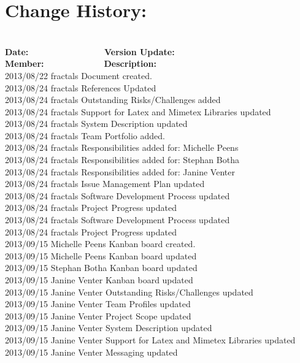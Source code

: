 \documentclass[29pt,a4paper]{moderncv}
\begin{document}
\section{\textbf{Change History:}}
\begin{tabbing}
\\\textbf{Date:} ~~~~~~~~~~~~~~~~~\= \textbf{Version Update:}~~~~~~~ \= \textbf{Member:}~~~~~~~~~~~~~~\= \textbf{Description:}\\
2013/08/22 \> fractals \> Document created.\\
2013/08/24  \> fractals \> References Updated\\
2013/08/24  \> fractals \> Outstanding Risks/Challenges added\\
2013/08/24  \> fractals \> Support for Latex and Mimetex Libraries updated\\
2013/08/24  \> fractals \> System Description updated\\
2013/08/24  \> fractals \> Team Portfolio added. \\
2013/08/24  \> fractals \> Responsibilities added for: Michelle Peens\\
2013/08/24  \> fractals \> Responsibilities added for: Stephan Botha\\	
2013/08/24  \> fractals \> Responsibilities added for: Janine Venter\\
2013/08/24  \> fractals \> Issue Management Plan updated\\
2013/08/24  \> fractals \> Software Development Process updated\\
2013/08/24  \> fractals \> Project Progress updated\\
2013/08/24  \> fractals \> Software Development Process updated\\
2013/08/24  \> fractals \> Project Progress updated\\
2013/09/15  \> Michelle Peens \> Kanban board created.\\
2013/09/15  \>  Michelle Peens \> Kanban board updated\\
2013/09/15  \> Stephan Botha \> Kanban board updated\\
2013/09/15  \> Janine Venter \> Kanban board updated\\
2013/09/15  \> Janine Venter \> Outstanding Risks/Challenges updated\\
2013/09/15  \> Janine Venter \> Team Profiles updated\\
2013/09/15  \>  Janine Venter \> Project Scope updated\\
2013/09/15  \> Janine Venter \> System Description updated\\
2013/09/15  \> Janine Venter \> Support for Latex and Mimetex Libraries updated\\
2013/09/15  \>  Janine Venter \> Messaging updated\\

\end{tabbing}
\end{document}
